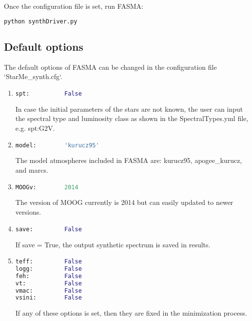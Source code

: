 \documentclass[a4paper,10pt]{article}
\begin{document}
Once the configuration file is set, run FASMA:
\begin{lstlisting}[language=Python]
python synthDriver.py
\end{lstlisting}


\subsection{Default options}

The default options of FASMA can be changed in the configuration file `StarMe\_synth.cfg`.
\begin{enumerate}
 \item
\begin{lstlisting}[language=Python]
spt:          False

\end{lstlisting}
In case the initial parameters of the stars are not known, the user can input the spectral type and luminosity class as shown in the SpectralTypes.yml file, e.g. spt:G2V.

\item
\begin{lstlisting}[language=Python]
model:        'kurucz95'
\end{lstlisting}
The model atmospheres included in FASMA are: kurucz95, apogee\_kurucz, and marcs.

\item
\begin{lstlisting}[language=Python]
MOOGv:        2014
\end{lstlisting}
The version of MOOG currently is 2014 but can easily updated to newer versions.

\item
\begin{lstlisting}[language=Python]
save:         False
\end{lstlisting}
If save = True, the output synthetic spectrum is saved in results.

\item
\begin{lstlisting}[language=Python]
teff:         False
logg:         False
feh:          False
vt:           False
vmac:         False
vsini:        False
\end{lstlisting}
If any of these options is set, then they are fixed in the minimization process.


\end{enumerate}
\end{document}
